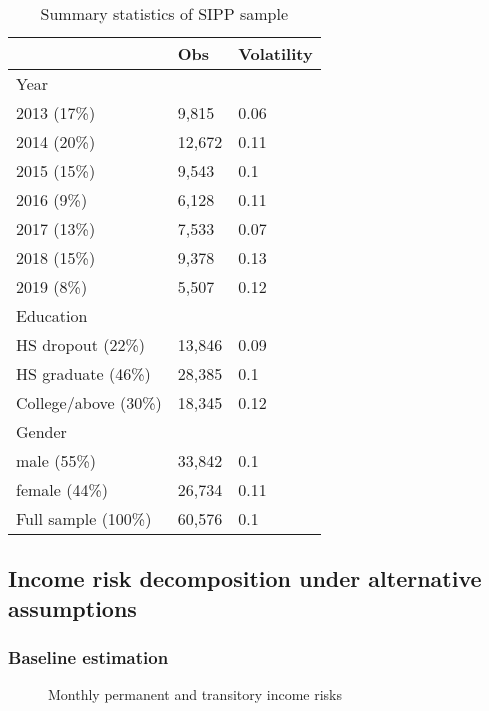 \begin{table}[!ht]
    \centering
    \caption{Summary statistics of SIPP sample}
    \label{tab:sipp_sum_stat}
\begin{tabular}{lll}
\hline \hline 
                     & Obs    & Volatility \\
                     \hline 
Year                 &        &            \\
\hline 
2013 (17\%)          & 9,815  & 0.06       \\
2014 (20\%)          & 12,672 & 0.11       \\
2015 (15\%)          & 9,543  & 0.1        \\
2016 (9\%)           & 6,128  & 0.11       \\
2017 (13\%)          & 7,533  & 0.07       \\
2018 (15\%)          & 9,378  & 0.13       \\
2019 (8\%)           & 5,507  & 0.12       \\
\hline 
Education                 &        &            \\
\hline 
HS dropout (22\%)    & 13,846 & 0.09       \\
HS graduate (46\%)   & 28,385 & 0.1        \\
College/above (30\%) & 18,345 & 0.12       \\

                     \hline 
Gender               &        &            \\
\hline 
male (55\%)          & 33,842 & 0.1        \\
female (44\%)        & 26,734 & 0.11       \\
\hline \hline 
Full sample (100\%)        & 60,576 & 0.1       \\
\hline \hline 
\end{tabular}
\end{table}

\subsection{Income risk decomposition under alternative assumptions}

\subsubsection{Baseline estimation}

 \begin{figure}[!ht]
    	\caption{Monthly permanent and transitory income risks}
    	\label{fig:decomposed_monthly}
    	\begin{center}
    	\end{center}
    \end{figure}
    
